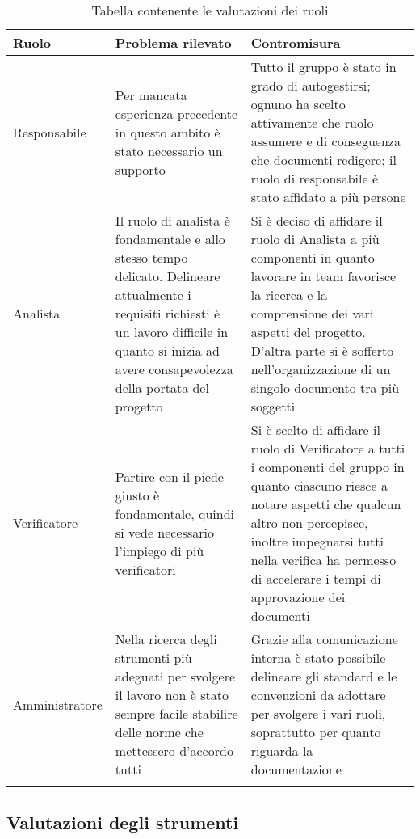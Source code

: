 \documentclass[../piano_di_qualifica.tex]{subfiles}
\begin{document}
\begin{center}
\begin{longtable}{|p{3cm}|p{4.5cm}|p{4.5cm}|}
		\hline
		\rowcolor{lightgray}
            \textbf{Ruolo} & \textbf{Problema rilevato} &  \textbf{Contromisura} \\
            \hline 
            Responsabile &
            Per mancata esperienza precedente in questo ambito è stato necessario un supporto  &
            Tutto il gruppo è stato in grado di autogestirsi; ognuno ha scelto attivamente che ruolo assumere e di conseguenza che documenti redigere; il ruolo di responsabile è stato affidato a più persone \\
            \hline
            Analista & 
            Il ruolo di analista è fondamentale e allo stesso tempo delicato. Delineare attualmente i requisiti richiesti è un lavoro difficile in quanto si inizia ad avere consapevolezza della portata del progetto &
            Si è deciso di affidare il ruolo di Analista a più componenti in quanto lavorare in team favorisce la ricerca e la comprensione dei vari aspetti del progetto. D'altra parte si è sofferto nell'organizzazione di un singolo documento tra più soggetti \\
            \hline
            Verificatore &
            Partire con il piede giusto è fondamentale, quindi si vede necessario l'impiego di più verificatori &
            Si è scelto di affidare il ruolo di Verificatore a tutti i componenti del gruppo in quanto ciascuno riesce a notare aspetti che qualcun altro non percepisce, inoltre impegnarsi tutti nella verifica ha permesso di accelerare i tempi di approvazione dei documenti \\
            \hline
		Amministratore &
            Nella ricerca degli strumenti più adeguati per svolgere il lavoro non è stato sempre facile stabilire delle norme che mettessero d'accordo tutti &
            Grazie alla comunicazione interna è stato possibile delineare gli standard e le convenzioni da adottare per svolgere i vari ruoli, soprattutto per quanto riguarda la documentazione \\
            \hline
            \rowcolor{white}
\caption{Tabella contenente le valutazioni dei ruoli }
\end{longtable}
\end{center}

\subsection{Valutazioni degli strumenti}
\label{sub:valut_strumenti}
\end{document}
